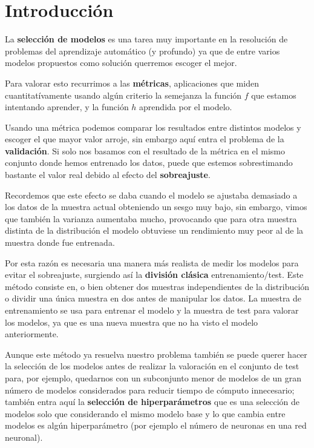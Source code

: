 
\chapter{Introducción}\label{ch:pv-introduccion}

La \textbf{selección de modelos} es una tarea muy importante en la resolución de problemas del aprendizaje automático (y profundo) ya que de entre varios modelos propuestos como solución querremos escoger el mejor.

Para valorar esto recurrimos a las \textbf{métricas}, aplicaciones que miden cuantitatívamente usando algún criterio la semejanza la función $f$ que estamos intentando aprender, y la función $h$ aprendida por el modelo.

Usando una métrica podemos comparar los resultados entre distintos modelos y escoger el que mayor valor arroje, sin embargo aquí entra el problema de la \textbf{validación}. Si solo nos basamos con el resultado de la métrica en el mismo conjunto donde hemos entrenado los datos, puede que estemos sobrestimando bastante el valor real debido al efecto del \textbf{sobreajuste}.

Recordemos que este efecto se daba cuando el modelo se ajustaba demasiado a los datos de la muestra actual obteniendo un sesgo muy bajo, sin embargo, vimos que también la varianza aumentaba mucho, provocando que para otra muestra distinta de la distribución el modelo obtuviese un rendimiento muy peor al de la muestra donde fue entrenada.

Por esta razón es necesaria una manera más realista de medir los modelos para evitar el sobreajuste, surgiendo así la \textbf{división clásica} entrenamiento/test. Este método consiste en, o bien obtener dos muestras independientes de la distribución o dividir una única muestra en dos antes de manipular los datos. La muestra de entrenamiento se usa para entrenar el modelo y la muestra de test para valorar los modelos, ya que es una nueva muestra que no ha visto el modelo anteriormente.

Aunque este método ya resuelva nuestro problema también se puede querer hacer la selección de los modelos antes de realizar la valoración en el conjunto de test para, por ejemplo, quedarnos con un subconjunto menor de modelos de un gran número de modelos considerados para reducir tiempo de cómputo innecesario; también entra aquí la \textbf{selección de hiperparámetros} que es una selección de modelos solo que considerando el mismo modelo base y lo que cambia entre modelos es algún hiperparámetro (por ejemplo el número de neuronas en una red neuronal).

